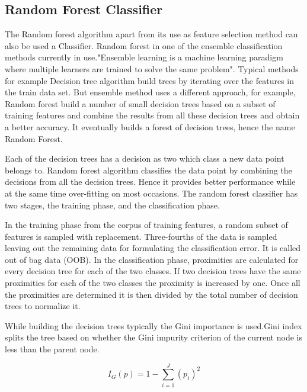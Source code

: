 \documentclass[sigconf]{acmart}
\begin{document}
\subsection{Random Forest Classifier}
The Random forest algorithm apart from its use as feature selection method can also be used a Classifier. Random forest in one of the ensemble classification methods currently in use."Ensemble learning is a machine learning paradigm where multiple learners are trained to solve the same problem"\cite{Zhou2016}. Typical methods for example Decision tree algorithm build trees by iterating over the features in the train data set. But ensemble method uses a different approach, for example, Random forest build a number of small decision trees based on a subset of training features and combine the results from all these decision trees and obtain a better accuracy. It eventually builds a forest of decision trees, hence the name Random Forest.\cite{Breiman2010}

Each of the decision trees has a decision as two which class a new data point belongs to. Random forest algorithm classifies the data point by combining the decisions from all the decision trees. Hence it provides better performance while at the same time over-fitting on most occasions. The random forest classifier has two stages, the training phase, and the classification phase. \cite{Breiman2010}

In the training phase from the corpus of training features, a random subset of features is sampled with replacement. Three-fourths of the data is sampled leaving out the remaining data for formulating the classification error. It is called out of bag data (OOB). In the classification phase, proximities are calculated for every decision tree for each of the two classes. If two decision trees have the same proximities for each of the two classes the proximity is increased by one. Once all the proximities are determined it is then divided by the total number of decision trees to normalize it.\cite{Breiman2010}

While building the decision trees typically the Gini importance is used.Gini index splits the tree based on whether the Gini impurity criterion of the current node is less than the parent node.

\begin{equation}
    I_G(p) = 1-\sum_{i=1}^{J} (p_i)^2
\end{equation}\\
\end{document}
